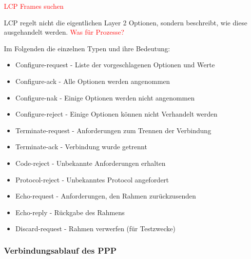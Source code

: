 \documentclass[12pt, a4paper, ngerman]{article}
\begin{document}
\large{\textcolor{red}{LCP Frames suchen}}

LCP regelt nicht die eigentlichen Layer 2 Optionen, sondern beschreibt, wie diese ausgehandelt werden. \textcolor{red}{Was für Prozesse?}

Im Folgenden die einzelnen Typen und ihre Bedeutung:

\begin{itemize}
	\item Configure-request	- Liste der vorgeschlagenen Optionen und Werte
	\item Configure-ack		- Alle Optionen werden angenommen
	\item	Configure-nak		- Einige Optionen werden nicht angenommen
	\item Configure-reject	- Einige Optionen können nicht Verhandelt werden
	\item Terminate-request	- Anforderungen zum Trennen der Verbindung
	\item Terminate-ack		- Verbindung wurde getrennt
	\item Code-reject		- Unbekannte Anforderungen erhalten
	\item Protocol-reject		- Unbekanntes Protocol angefordert
	\item Echo-request		- Anforderungen, den Rahmen zurückzusenden
	\item Echo-reply		- Rückgabe des Rahmens
	\item	Discard-request	- Rahmen verwerfen (für Testzwecke)
\end{itemize} 



\subsubsection{Verbindungsablauf des PPP}
\end{document}
